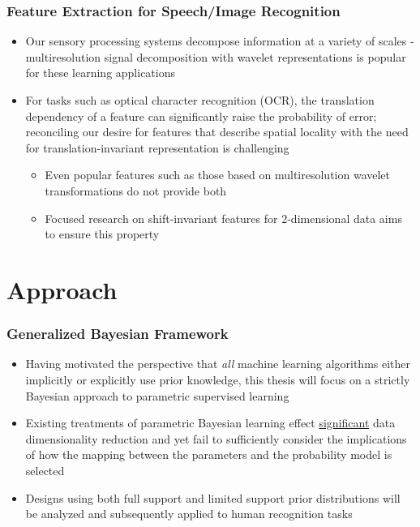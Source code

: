 \documentclass[aspectratio=169,usenames,dvipsnames]{beamer}
\begin{document}
\begin{frame}
\frametitle{Feature Extraction for Speech/Image Recognition}

\begin{itemize}
\item Our sensory processing systems decompose information at a variety of scales - multiresolution signal decomposition with wavelet representations \cite{mallat-wavtour} is popular for these learning applications
\vspace{1em}
\item For tasks such as optical character recognition (OCR), the translation dependency of a feature can significantly raise the probability of error; reconciling our desire for features that describe spatial locality with the need for translation-invariant representation is challenging
	\vspace{0.25em}
	\begin{itemize}
	\item Even popular features such as those based on multiresolution wavelet transformations \cite{mallat-multires} do not provide both
	\vspace{0.25em}
	\item Focused research on shift-invariant features for 2-dimensional data \cite{marco} aims to ensure this property
	\end{itemize}
\end{itemize}

\end{frame}









\section{Approach}


\begin{frame}
\frametitle{Generalized Bayesian Framework}

\begin{itemize}
\item Having motivated the perspective that \emph{all} machine learning algorithms either implicitly or explicitly use prior knowledge, this thesis will focus on a strictly \alert{Bayesian approach} to parametric supervised learning
\vspace{1em}
\item Existing treatments of parametric Bayesian learning effect \underline{significant} data dimensionality reduction and yet fail to sufficiently consider the implications of how the mapping between the parameters and the probability model is selected
\vspace{1em}
\item Designs using both \alert{full support} and \alert{limited support} prior distributions will be analyzed and subsequently applied to human recognition tasks
\end{itemize}

\end{frame}
\end{document}
